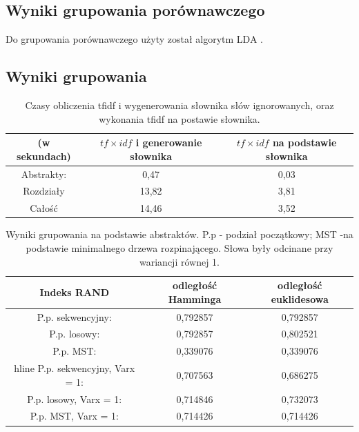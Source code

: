 \documentclass{article}
\begin{document}
\subsection{Wyniki grupowania porównawczego}

Do grupowania porównawczego użyty został algorytm LDA .

\subsection{Wyniki grupowania}

\begin{table}[H]
	\centering
	\begin{tabular}{c|c|c}
		(w sekundach) & $tf \times idf$ i generowanie słownika & $tf \times idf$ na podstawie słownika \\ \hline
		Abstrakty: & 0,47 & 0,03 \\ \hline
		Rozdziały & 13,82 & 3,81 \\ \hline
		Całość & 14,46 & 3,52 \\ \hline
	\end{tabular}
	\caption{Czasy obliczenia tfidf i wygenerowania słownika słów ignorowanych, oraz wykonania tfidf na postawie słownika.}
	\label{tab:tfidfczas}
\end{table}


\begin{table}[H]
	\centering
	\begin{tabular}{c|c|c}
		Indeks RAND & odległość Hamminga & odległość euklidesowa \\ \hline
		P.p. sekwencyjny: & 0,792857 & 0,792857 \\ \hline
		P.p. losowy: & 0,792857 & 0,802521  \\ \hline
		P.p. MST: & 0,339076 & 0,339076 \\hline
		P.p. sekwencyjny, Varx = 1: & 0,707563 & 0,686275 \\ \hline
		P.p. losowy, Varx = 1: & 0,714846 & 0,732073  \\ \hline
		P.p. MST, Varx = 1: & 0,714426 & 0,714426
		\end{tabular}
		\caption{Wyniki grupowania na podstawie abstraktów. P.p - podział początkowy; MST -na podstawie minimalnego drzewa rozpinającego. Słowa były odcinane przy wariancji równej 1.}
		\label{tab:abstraktywyniki}
\end{table}
\end{document}
